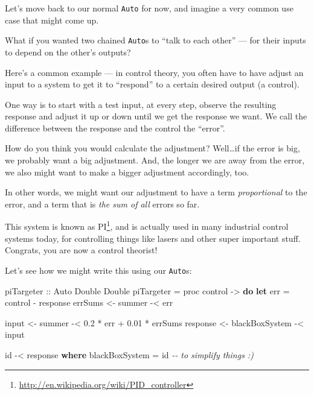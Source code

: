 \documentclass[]{article}
\newenvironment{Shaded}{}{}
\newcommand{\CommentTok}[1]{\textcolor[rgb]{0.38,0.63,0.69}{\textit{#1}}}
\newcommand{\DataTypeTok}[1]{\textcolor[rgb]{0.56,0.13,0.00}{#1}}
\newcommand{\FloatTok}[1]{\textcolor[rgb]{0.25,0.63,0.44}{#1}}
\newcommand{\FunctionTok}[1]{\textcolor[rgb]{0.02,0.16,0.49}{#1}}
\newcommand{\KeywordTok}[1]{\textcolor[rgb]{0.00,0.44,0.13}{\textbf{#1}}}
\newcommand{\NormalTok}[1]{#1}
\newcommand{\OperatorTok}[1]{\textcolor[rgb]{0.40,0.40,0.40}{#1}}
\newcommand{\OtherTok}[1]{\textcolor[rgb]{0.00,0.44,0.13}{#1}}
\renewcommand{\href}[2]{#2\footnote{\url{#1}}}
\begin{document}
Let's move back to our normal \texttt{Auto} for now, and imagine a very common
use case that might come up.

What if you wanted two chained \texttt{Auto}s to ``talk to each other'' --- for
their inputs to depend on the other's outputs?

Here's a common example --- in control theory, you often have to have adjust an
input to a system to get it to ``respond'' to a certain desired output (a
control).

One way is to start with a test input, at every step, observe the resulting
response and adjust it up or down until we get the response we want. We call the
difference between the response and the control the ``error''.

How do you think you would calculate the adjustment? Well\ldots if the error is
big, we probably want a big adjustment. And, the longer we are away from the
error, we also might want to make a bigger adjustment accordingly, too.

In other words, we might want our adjustment to have a term \emph{proportional}
to the error, and a term that is \emph{the sum of all} errors so far.

This system is known as \href{http://en.wikipedia.org/wiki/PID_controller}{PI},
and is actually used in many industrial control systems today, for controlling
things like lasers and other super important stuff. Congrats, you are now a
control theorist!

Let's see how we might write this using our \texttt{Auto}s:

\begin{Shaded}
\begin{Highlighting}[]
\OtherTok{piTargeter ::} \DataTypeTok{Auto} \DataTypeTok{Double} \DataTypeTok{Double}
\NormalTok{piTargeter }\OtherTok{=}\NormalTok{ proc control }\OtherTok{{-}>} \KeywordTok{do}
    \KeywordTok{let}\NormalTok{ err }\OtherTok{=}\NormalTok{ control }\OperatorTok{{-}}\NormalTok{ response}
\NormalTok{    errSums  }\OtherTok{<{-}}\NormalTok{ summer         }\OperatorTok{{-}<}\NormalTok{ err}

\NormalTok{    input    }\OtherTok{<{-}}\NormalTok{ summer         }\OperatorTok{{-}<} \FloatTok{0.2} \OperatorTok{*}\NormalTok{ err }\OperatorTok{+} \FloatTok{0.01} \OperatorTok{*}\NormalTok{ errSums}
\NormalTok{    response }\OtherTok{<{-}}\NormalTok{ blackBoxSystem }\OperatorTok{{-}<}\NormalTok{ input}

    \FunctionTok{id} \OperatorTok{{-}<}\NormalTok{ response}
  \KeywordTok{where}
\NormalTok{    blackBoxSystem }\OtherTok{=} \FunctionTok{id}     \CommentTok{{-}{-} to simplify things :)}
\end{Highlighting}
\end{Shaded}
\end{document}
